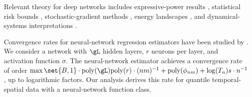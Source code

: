 \documentclass[twoside,11pt]{article}
\newenvironment{revision}{\color{revisionred}}{}
\begin{document}
\begin{revision}
Relevant theory for deep networks includes expressive-power results \citep{pmlr-v70-raghu17a}, statistical risk bounds \citep{barron1989statistical}, stochastic-gradient methods \citep{reddi2019convergence}, energy landscapes \citep{choromanska2015loss}, and dynamical-systems interpretations \citep{kumpati1990identification}.

Convergence rates for neural-network regression estimators have been studied by \cite{schmidt2020nonparametric, barron1991complexity, oono2019approximation, suzuki2018adaptivity, kohler2019rate}. We consider a network with $\gL$ hidden layers, $r$ neurons per layer, and activation function $\sigma$. The neural-network estimator achieves a convergence rate of order
\(\max\set{B,1}\cdot \text{poly}(\gL) \text{poly}(r)\cdot (nm)^{-1} + \text{poly}(\phi_{nm})+\log(T_n)s \cdot n^{-1}\), up to logarithmic factors. Our analysis derives this rate for quantile temporal-spatial data with a neural-network function class.
\end{revision}

\end{document}
